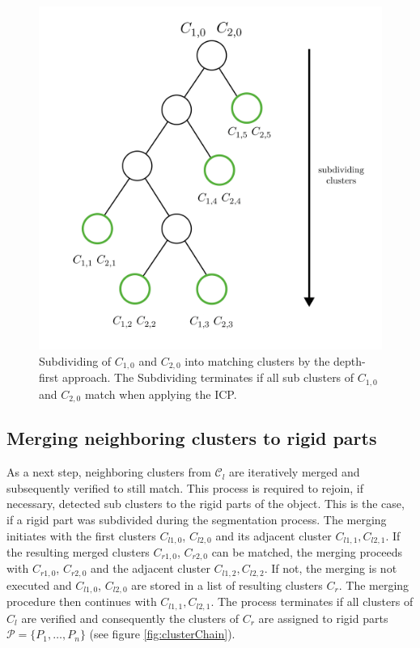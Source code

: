 \documentclass[notitlepage,english]{hgbreport}
\begin{document}
	\begin{figure}
		\centering
		\includegraphics[width=0.7\linewidth]{IllustrationTree}
		\caption{Subdividing of $C_{1,0}$ and $C_{2,0}$ into matching clusters by the depth-first approach. The Subdividing terminates if all sub clusters of $C_{1,0}$ and $C_{2,0}$ match when applying the ICP.}
		\label{fig:illustrationTree}
	\end{figure}
	
	\subsection{Merging neighboring clusters to rigid parts}
	
	As a next step, neighboring clusters from $\mathcal{C}_l$ are iteratively merged and subsequently verified to still match. This process is required to rejoin, if necessary, detected sub clusters to the rigid parts of the object. This is the case, if a rigid part was subdivided during the segmentation process. The merging initiates with the first clusters $C_{l1,0}$, $C_{l2,0}$ and its adjacent cluster $C_{l1,1},C_{l2,1}$. If the resulting merged clusters $C_{r1,0}$, $C_{r2,0}$ can be matched, the merging proceeds with $C_{r1,0}$, $C_{r2,0}$ and the adjacent cluster $C_{l1,2},C_{l2,2}$. If not, the merging is not executed and $C_{l1,0}$, $C_{l2,0}$ are stored in a list of resulting clusters $C_r$. The merging procedure then continues with $C_{l1,1},C_{l2,1}$. The process terminates if all clusters of $C_l$ are verified and consequently the clusters of $C_r$ are assigned to rigid parts $ \mathcal{P} =  \{P_1,\ldots,P_n\}$ (see figure \ref{fig:clusterChain}). 
	
\end{document}
